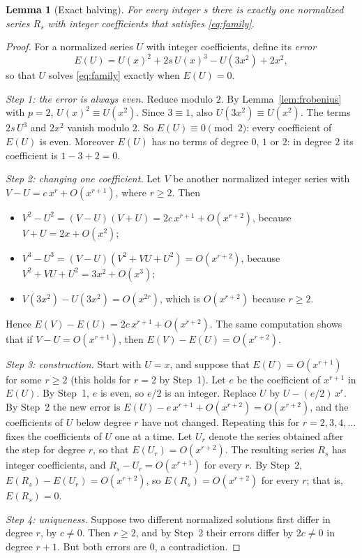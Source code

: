 \documentclass[11pt,a4paper]{article}
\newtheorem{lemma}[theorem]{Lemma}
\theoremstyle{definition}
\theoremstyle{remark}
\begin{document}
\begin{lemma}[Exact halving]\label{lem:family}
For every integer $s$ there is exactly one normalized series $R_s$ with integer coefficients that satisfies
\eqref{eq:family}.
\end{lemma}

\begin{proof}
For a normalized series $U$ with integer coefficients, define its \emph{error}
\[
E(U)=U(x)^2+2s\,U(x)^3-U(3x^2)+2x^2 ,
\]
so that $U$ solves \eqref{eq:family} exactly when $E(U)=0$.

\emph{Step 1: the error is always even.} Reduce modulo $2$. By Lemma~\ref{lem:frobenius} with $p=2$,
$U(x)^2\equiv U(x^2)$. Since $3\equiv1$, also $U(3x^2)\equiv U(x^2)$. The terms $2s\,U^3$ and $2x^2$ vanish modulo $2$.
So $E(U)\equiv0\pmod2$: every coefficient of $E(U)$ is even. Moreover $E(U)$ has no terms of degree $0$, $1$ or $2$:
in degree $2$ its coefficient is $1-3+2=0$.

\emph{Step 2: changing one coefficient.} Let $V$ be another normalized integer series with
$V-U=c\,x^r+O(x^{r+1})$, where $r\ge2$. Then
\begin{itemize}
\item $V^2-U^2=(V-U)(V+U)=2c\,x^{r+1}+O(x^{r+2})$, because $V+U=2x+O(x^2)$;
\item $V^3-U^3=(V-U)(V^2+VU+U^2)=O(x^{r+2})$, because $V^2+VU+U^2=3x^2+O(x^3)$;
\item $V(3x^2)-U(3x^2)=O(x^{2r})$, which is $O(x^{r+2})$ because $r\ge2$.
\end{itemize}
Hence $E(V)-E(U)=2c\,x^{r+1}+O(x^{r+2})$. The same computation shows that if $V-U=O(x^{r+1})$, then
$E(V)-E(U)=O(x^{r+2})$.

\emph{Step 3: construction.} Start with $U=x$, and suppose that $E(U)=O(x^{r+1})$ for some $r\ge2$ (this holds for
$r=2$ by Step~1). Let $e$ be the coefficient of $x^{r+1}$ in $E(U)$. By Step~1, $e$ is even, so $e/2$ is an integer.
Replace $U$ by $U-(e/2)\,x^r$. By Step~2 the new error is $E(U)-e\,x^{r+1}+O(x^{r+2})=O(x^{r+2})$, and the coefficients
of $U$ below degree $r$ have not changed. Repeating this for $r=2,3,4,\dots$ fixes the coefficients of $U$ one at a
time. Let $U_r$ denote the series obtained after the step for degree $r$, so that $E(U_r)=O(x^{r+2})$. The
resulting series $R_s$ has integer coefficients, and $R_s-U_r=O(x^{r+1})$ for every $r$. By Step~2,
$E(R_s)-E(U_r)=O(x^{r+2})$, so $E(R_s)=O(x^{r+2})$ for every $r$; that is, $E(R_s)=0$.

\emph{Step 4: uniqueness.} Suppose two different normalized solutions first differ in degree $r$, by $c\ne0$. Then
$r\ge2$, and by Step~2 their errors differ by $2c\ne0$ in degree $r+1$. But both errors are $0$, a contradiction.
\end{proof}
\end{document}
